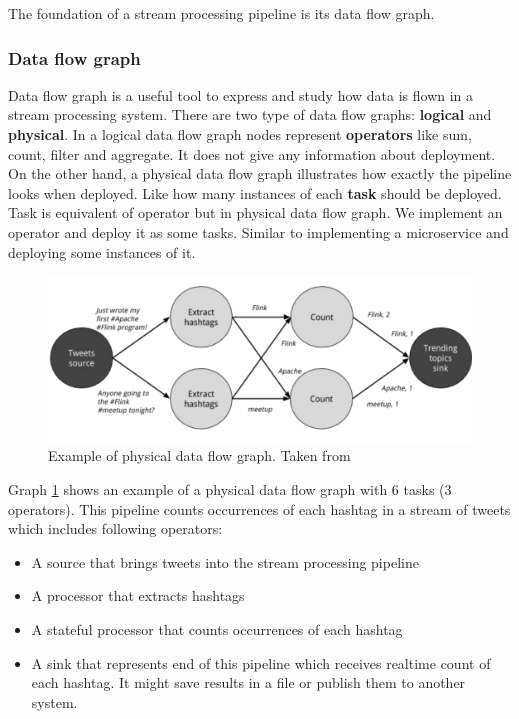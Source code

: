 \documentclass[a4]{report}
\begin{document}
    The foundation of a stream processing pipeline is its data flow graph.

    \subsubsection{Data flow graph}
    Data flow graph is a useful tool to express and study how data is flown in a stream processing system.
    There are two type of data flow graphs: \textbf{logical} and \textbf{physical}.
    In a logical data flow graph nodes represent \textbf{operators} like sum, count, filter and aggregate.
    It does not give any information about deployment.
    On the other hand, a physical data flow graph illustrates how exactly the pipeline looks when deployed.
    Like how many instances of each \textbf{task} should be deployed.
    Task is equivalent of operator but in physical data flow graph.
    We implement an operator and deploy it as some tasks.
    Similar to implementing a microservice and deploying some instances of it.

    \begin{figure}[ht]
        \caption{Example of physical data flow graph. Taken from \cite{flink}}
        \label{physical-data-flow-graph-example}
        \includegraphics[width=\linewidth, scale=0.6]{images/physical-data-flow-graph.png}
    \end{figure}

    Graph \ref{physical-data-flow-graph-example} shows an example of a physical data flow graph with 6 tasks (3
    operators).
    This pipeline counts occurrences of each hashtag in a stream of tweets which includes following operators:

    \begin{itemize}
        \item A source that brings tweets into the stream processing pipeline
        \item A processor that extracts hashtags
        \item A stateful processor that counts occurrences of each hashtag
        \item A sink that represents end of this pipeline which receives realtime count of each hashtag. It might
        save results in a file or publish them to another system.
    \end{itemize}
\end{document}
